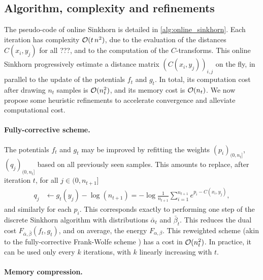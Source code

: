 \subsection{Algorithm, complexity and refinements}

The pseudo-code of online Sinkhorn is detailed in \autoref{alg:online_sinkhorn}.
Each iteration has complexity $\mathcal{O}(t\,n^2)$, due to the evaluation of
the distances $C(x_i, y_j)$ for all ???, and to the computation of the $C$-transforms. This online Sinkhorn progressively estimate a distance matrix $(C(x_i,y_j))_{i,j}$ on the fly,
in parallel to the update of the potentials $f_t$ and $g_t$. In total, its computation cost
after drawing $n_t$ samples is $\mathcal{O}(n_t^2)$, and its memory cost is $\mathcal{O}(n_t)$.
%
We now propose some heuristic refinements to accelerate convergence and alleviate computational cost.


\paragraph{Fully-corrective scheme.} 

The potentials $f_t$ and $g_t$ may be
improved by refitting the weights $(p_i)_{(0, n_t]}$, $(q_j)_{(0, n_t]}$ based
on all previously seen samples. This
amounts to replace, after iteration $t$, for all $j \in (0, n_{t+1}]$
\begin{align}
    q_j &\gets g_t(y_j) - \log(n_{t+1}) 
    = - \log \frac{1}{n_{t+1}} 
    \sum_{i=1}^{n_{t+1}} e^{p_i - C(x_i, y_j)},
\end{align}
and similarly for each $p_i$. This corresponds exactly to performing one step of the
 discrete Sinkhorn algorithm with distributions $\bar \alpha_t$ and $\bar
 \beta_t$. This reduces the dual cost $F_{ \bar \alpha, \bar \beta}(f_t,
 g_t)$, and on average, the energy $F_{\alpha, \beta}$. This
 reweighted scheme (akin to the fully-corrective Frank-Wolfe scheme \cite{lacoste2015global}) has
 a cost in $\mathcal{O}(n_t^2)$. In practice, it can be used only every $k$ iterations, with $k$ linearly
 increasing with $t$.

\paragraph{Memory compression.} 

